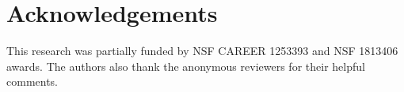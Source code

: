 \section*{Acknowledgements}
This research was partially funded by NSF CAREER 1253393 and NSF 1813406 awards. 
The authors also thank the anonymous reviewers for their helpful comments.
